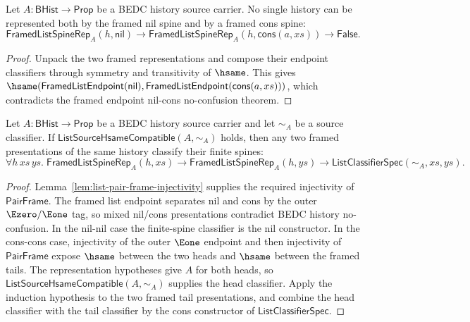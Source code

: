\begin{theorem}
\label{thm:framed-list-spine-rep-nil-cons-no-confusion}
Let $A:\mathsf{BHist}\to\mathsf{Prop}$ be a BEDC history source carrier. No
single history can be represented both by the framed nil spine and by a framed
cons spine:
$$
\mathsf{FramedListSpineRep}_A(h,\mathsf{nil})\to
\mathsf{FramedListSpineRep}_A(h,\mathsf{cons}(a,xs))\to
\mathsf{False}.
$$
\end{theorem}
\begin{proof}
Unpack the two framed representations and compose their endpoint classifiers
through symmetry and transitivity of $\hsame$. This gives
$\hsame(\mathsf{FramedListEndpoint}(\mathsf{nil}),
\mathsf{FramedListEndpoint}(\mathsf{cons}(a,xs)))$, which contradicts the
framed endpoint nil-cons no-confusion theorem.
\end{proof}

\begin{theorem}
\label{thm:framed-list-spine-coherence}
Let $A:\mathsf{BHist}\to\mathsf{Prop}$ be a BEDC history source carrier and let
$\sim_A$ be a source classifier. If
$\mathsf{ListSourceHsameCompatible}(A,\sim_A)$ holds, then any two framed
presentations of the same history classify their finite spines:
$$
\forall h\,xs\,ys.\;
\mathsf{FramedListSpineRep}_A(h,xs)\to
\mathsf{FramedListSpineRep}_A(h,ys)\to
\mathsf{ListClassifierSpec}(\sim_A,xs,ys).
$$
\end{theorem}
\begin{proof}
Lemma~\ref{lem:list-pair-frame-injectivity} supplies the required injectivity
of $\mathsf{PairFrame}$. The framed list endpoint separates nil and cons by
the outer $\Ezero/\Eone$ tag, so mixed nil/cons presentations contradict BEDC
history no-confusion. In the nil-nil case the finite-spine classifier is the nil
constructor. In the cons-cons case, injectivity of the outer $\Eone$ endpoint
and then injectivity of $\mathsf{PairFrame}$ expose $\hsame$ between the two
heads and $\hsame$ between the framed tails. The representation hypotheses give
$A$ for both heads, so $\mathsf{ListSourceHsameCompatible}(A,\sim_A)$ supplies
the head classifier. Apply the induction hypothesis to the two framed tail
presentations, and combine the head classifier with the tail classifier by the
cons constructor of $\mathsf{ListClassifierSpec}$.
\end{proof}

